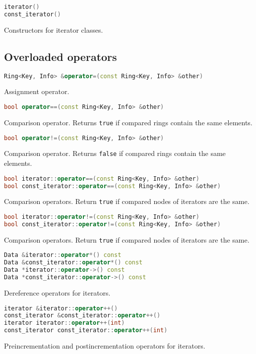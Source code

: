\documentclass{article}
\begin{document}
\begin{lstlisting}[language=C++]
iterator()
const_iterator()
\end{lstlisting}
Constructors for iterator classes.
\vspace{\baselineskip}

\subsection{Overloaded operators}

\begin{lstlisting}[language=C++]
Ring<Key, Info> &operator=(const Ring<Key, Info> &other)
\end{lstlisting}
Assignment operator.

\newpage
\begin{lstlisting}[language=C++]
bool operator==(const Ring<Key, Info> &other)
\end{lstlisting}
Comparison operator. Returns {\tt true} if compared rings contain the same elements.

\begin{lstlisting}[language=C++]
bool operator!=(const Ring<Key, Info> &other)
\end{lstlisting}
Comparison operator. Returns {\tt false} if compared rings contain the same elements.

\begin{lstlisting}[language=C++]
bool iterator::operator==(const Ring<Key, Info> &other)
bool const_iterator::operator==(const Ring<Key, Info> &other)
\end{lstlisting}
Comparison operators. Return {\tt true} if compared nodes of iterators are the same.

\begin{lstlisting}[language=C++]
bool iterator::operator!=(const Ring<Key, Info> &other)
bool const_iterator::operator!=(const Ring<Key, Info> &other)
\end{lstlisting}
Comparison operators. Return {\tt true} if compared nodes of iterators are the same.

\begin{lstlisting}[language=C++]
Data &iterator::operator*() const
Data &const_iterator::operator*() const
Data *iterator::operator->() const
Data *const_iterator::operator->() const
\end{lstlisting}
Dereference operators for iterators.

\begin{lstlisting}[language=C++]
iterator &iterator::operator++()
const_iterator &const_iterator::operator++()
iterator iterator::operator++(int)
const_iterator const_iterator::operator++(int)
\end{lstlisting}
Preincrementation and postincrementation operators for iterators.
\end{document}
